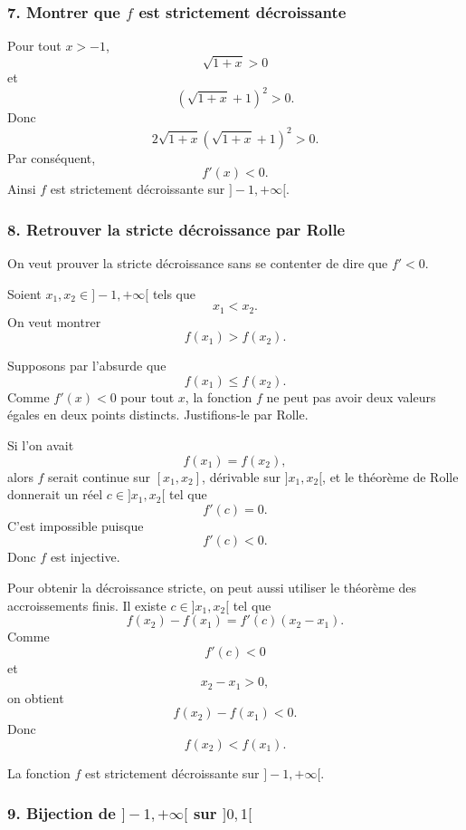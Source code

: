 \documentclass[11pt,a4paper]{article}
\begin{document}

\subsubsection*{7. Montrer que \(f\) est strictement décroissante}

Pour tout \(x>-1\),
\[
\sqrt{1+x}>0
\]
et
\[
(\sqrt{1+x}+1)^2>0.
\]
Donc
\[
2\sqrt{1+x}(\sqrt{1+x}+1)^2>0.
\]
Par conséquent,
\[
f'(x)<0.
\]
Ainsi \(f\) est strictement décroissante sur \(]-1,+\infty[\).


\subsubsection*{8. Retrouver la stricte décroissance par Rolle}

On veut prouver la stricte décroissance sans se contenter de dire que \(f'<0\).

Soient \(x_1,x_2\in]-1,+\infty[\) tels que
\[
x_1<x_2.
\]
On veut montrer
\[
f(x_1)>f(x_2).
\]

Supposons par l'absurde que
\[
f(x_1)\leq f(x_2).
\]
Comme \(f'(x)<0\) pour tout \(x\), la fonction \(f\) ne peut pas avoir deux valeurs égales en deux points distincts. Justifions-le par Rolle.

Si l'on avait
\[
f(x_1)=f(x_2),
\]
alors \(f\) serait continue sur \([x_1,x_2]\), dérivable sur \(]x_1,x_2[\), et le théorème de Rolle donnerait un réel \(c\in]x_1,x_2[\) tel que
\[
f'(c)=0.
\]
C'est impossible puisque
\[
f'(c)<0.
\]
Donc \(f\) est injective.

Pour obtenir la décroissance stricte, on peut aussi utiliser le théorème des accroissements finis. Il existe \(c\in]x_1,x_2[\) tel que
\[
f(x_2)-f(x_1)=f'(c)(x_2-x_1).
\]
Comme
\[
f'(c)<0
\]
et
\[
x_2-x_1>0,
\]
on obtient
\[
f(x_2)-f(x_1)<0.
\]
Donc
\[
f(x_2)<f(x_1).
\]

\begin{resultatbox}
La fonction \(f\) est strictement décroissante sur \(]-1,+\infty[\).
\end{resultatbox}


\subsubsection*{9. Bijection de \(]-1,+\infty[\) sur \(]0,1[\)}
\end{document}
